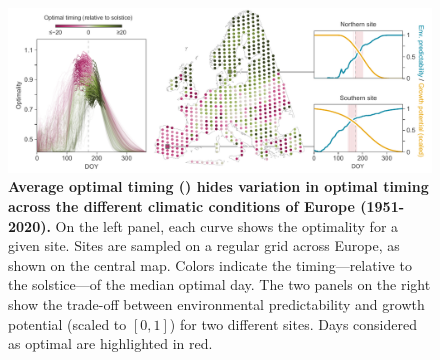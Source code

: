 \documentclass[11pt,letter]{article}
\begin{document}
\begin{figure}[h]
\hspace*{-1.2cm}
\includegraphics{local_optimality_alt.pdf}
\vspace*{-0.9cm} %
\caption{\textbf{Average optimal timing () hides variation in optimal timing across the different climatic conditions of Europe (1951-2020).} On the left panel, each curve shows the optimality for a given site. Sites are sampled on a regular grid across Europe, as shown on the central map. Colors indicate the timing---relative to the solstice---of the median optimal day. The two panels on the right show the trade-off between environmental predictability and growth potential (scaled to $[0,1]$) for two different sites. Days considered as optimal are highlighted in red.}
\label{fig:localoptimality}
\end{figure}

\clearpage


\end{document}

